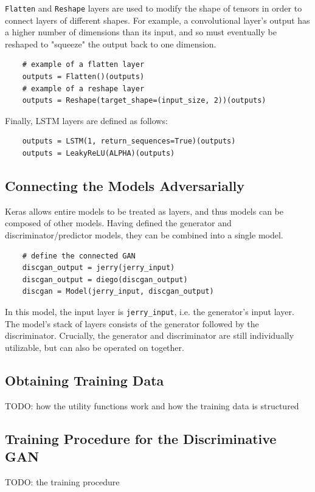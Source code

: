 \documentclass[12pt, titlepage]{report}
\theoremstyle{definition}
\begin{document}
\texttt{Flatten} and \texttt{Reshape} layers are used to modify the shape of tensors in order to connect layers of different shapes. For example, a convolutional layer's output has a higher number of dimensions than its input, and so must eventually be reshaped to "squeeze" the output back to one dimension.

\begin{verbatim}
    # example of a flatten layer
    outputs = Flatten()(outputs)
    # example of a reshape layer
    outputs = Reshape(target_shape=(input_size, 2))(outputs)
\end{verbatim}

Finally, LSTM layers are defined as follows:

\begin{verbatim}
    outputs = LSTM(1, return_sequences=True)(outputs)
    outputs = LeakyReLU(ALPHA)(outputs)
\end{verbatim}



\subsection{Connecting the Models Adversarially}
Keras allows entire models to be treated as layers, and thus models can be composed of other models. Having defined the generator and discriminator/predictor models, they can be combined into a single model.

\begin{verbatim}
    # define the connected GAN
    discgan_output = jerry(jerry_input)
    discgan_output = diego(discgan_output)
    discgan = Model(jerry_input, discgan_output)
\end{verbatim}

In this model, the input layer is \texttt{jerry_input}, i.e. the generator's input layer. The model's stack of layers consists of the generator followed by the discriminator. Crucially, the generator and discriminator are still individually utilizable, but can also be operated on together.

\subsection{Obtaining Training Data}
TODO: how the utility functions work and how the training data is structured
\subsection{Training Procedure for the Discriminative GAN}
TODO: the training procedure
\end{document}
